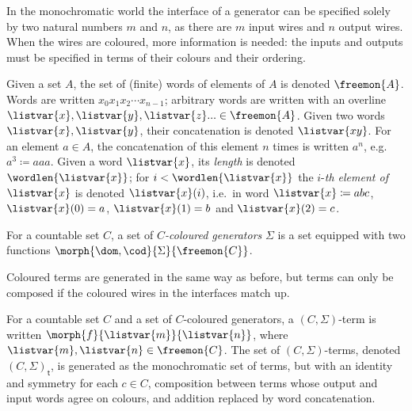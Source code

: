 In the monochromatic world the interface of a generator can be specified solely
by two natural numbers \(m\) and \(n\), as there are \(m\) input wires and
\(n\) output wires.
When the wires are coloured, more information is needed: the inputs and outputs
must be specified in terms of their colours and their ordering.

\begin{notation}[Words]\label{not:words}
    Given a set \(A\), the set of (finite) words of elements of \(A\) is denoted
    \(\freemon{A}\).
    Words are written \(x_0x_1x_2{\cdots}x_{n-1}\); arbitrary words are written
    with an overline \(
    \listvar{x}, \listvar{y}, \listvar{z}... \in \freemon{A}
    \).
    Given two words \(\listvar{x}, \listvar{y}\), their concatenation is
    denoted \(\listvar{xy}\).
    For an element \(a \in A\), the concatenation of this element \(n\) times is
    written \(a^n\), e.g.\ \(a^3 \coloneqq aaa\).
    Given a word \(\listvar{x}\), its \emph{length} is denoted
    \(\wordlen{\listvar{x}}\); for \(i < \wordlen{\listvar{x}}\) the
    \(i\)-\emph{th element of \(\listvar{x}\)} is denoted \(\listvar{x}(i)\),
    i.e.\ in word \(\listvar{x} \coloneqq abc\), \(\listvar{x}(0) = a\),
    \(\listvar{x}(1) = b\) and \(\listvar{x}(2) = c\).
\end{notation}

\begin{definition}
    For a countable set \(C\), a set of \emph{\(C\)-coloured generators}
    \(\Sigma\) is a set equipped with two functions
    \(\morph{\dom,\cod}{\Sigma}{\freemon{C}}\).
\end{definition}

Coloured terms are generated in the same way as before, but terms can only be
composed if the coloured wires in the interfaces match up.

\begin{definition}
    For a countable set \(C\) and a set of \(C\)-coloured generators, a
    \((C,\Sigma)\)-term is written \(\morph{f}{\listvar{m}}{\listvar{n}}\),
    where \(\listvar{m},\listvar{n} \in \freemon{C}\).
    The set of \((C,\Sigma)\)-terms, denoted \((C,\Sigma)_\mathsf{t}\), is
    generated as the monochromatic set of terms, but with an
    identity and symmetry for each \(c \in C\), composition between
    terms whose output and input words agree on colours, and addition replaced
    by word concatenation.
\end{definition}

